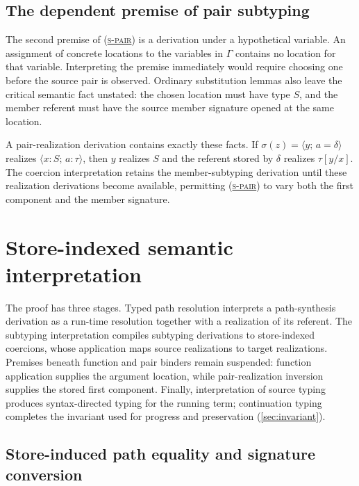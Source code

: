 \documentclass[acmsmall,screen,nonacm]{acmart}
\newcommand{\ruleref}[1]{%
  \textsc{(\hyperref[rule:#1]{#1})}}
\newcommand{\pairty}[4]{\langle #1\!:\!#2;\,#3\!:\!#4\rangle}
\newcommand{\pairval}[3]{\langle #1;\,#2=#3\rangle}
\begin{document}
\subsection{The dependent premise of pair subtyping}

The second premise of \ruleref{s-pair} is a derivation under a hypothetical
variable. An assignment of concrete locations to the variables in \(\Gamma\)
contains no location for that variable. Interpreting the premise immediately
would require choosing one before the source pair is observed. Ordinary
substitution lemmas also leave the critical semantic fact unstated: the
chosen location must have type \(S\), and the member referent must have the
source member signature opened at the same location.

A pair-realization derivation contains exactly these facts. If
\(\sigma(z)=\pairval{y}{a}{\delta}\) realizes
\(\pairty{x}{S}{a}{\tau}\), then \(y\) realizes \(S\) and the referent stored
by \(\delta\) realizes \(\tau[y/x]\). The coercion interpretation retains the
member-subtyping derivation until these realization derivations become
available, permitting \ruleref{s-pair} to vary both the first component and the member
signature.

\section{Store-indexed semantic interpretation}
\label{sec:coercions}

The proof has three stages. Typed path resolution interprets a path-synthesis
derivation as a run-time resolution together with a realization of its
referent. The subtyping interpretation compiles subtyping derivations to
store-indexed coercions, whose application maps source realizations to target
realizations. Premises beneath function and pair binders remain suspended:
function application supplies the argument location, while pair-realization
inversion supplies the stored first component. Finally, interpretation of
source typing produces syntax-directed typing for the running term;
continuation typing completes the invariant used for progress and
preservation (\cref{sec:invariant}).

\subsection{Store-induced path equality and signature conversion}
\end{document}
